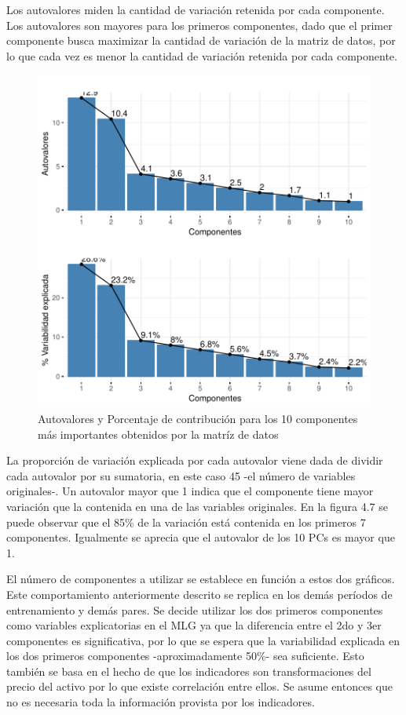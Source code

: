 \documentclass[a4paper,12pt]{Latex/Classes/PhDthesisPSnPDF}
\begin{document}
Los autovalores miden la cantidad de variación retenida por cada componente. Los autovalores son mayores para los primeros componentes, dado que el primer componente busca maximizar la cantidad de variación de la matriz de datos, por lo que cada vez es menor la cantidad de variación retenida por cada componente.

\begin{figure}[H]
\centering
\includegraphics{main-013}
\caption{Autovalores y Porcentaje de contribución para los 10 componentes más importantes obtenidos por la matríz de datos}
\end{figure}

La proporción de variación explicada por cada autovalor viene dada de dividir cada autovalor por su sumatoria, en este caso 45 -el número de variables originales-. Un autovalor mayor que 1 indica que el componente tiene mayor variación que la contenida en una de las variables originales. En la figura 4.7 se puede observar que el 85\% de la variación está contenida en los primeros 7 componentes. Igualmente se aprecia que el autovalor de los 10 PCs es mayor que 1. 

El número de componentes a utilizar se establece en función a estos dos gráficos. Este comportamiento anteriormente descrito se replica en los demás períodos de entrenamiento y demás pares. Se decide utilizar los dos primeros componentes como variables explicatorias en el MLG ya que la diferencia entre el 2do y 3er componentes es significativa, por lo que se espera que la variabilidad explicada en los dos primeros componentes -aproximadamente 50\%- sea suficiente. Esto también se basa en el hecho de que los indicadores son transformaciones del precio del activo por lo que existe correlación entre ellos. Se asume entonces que no es necesaria toda la información provista por los indicadores.
\end{document}
